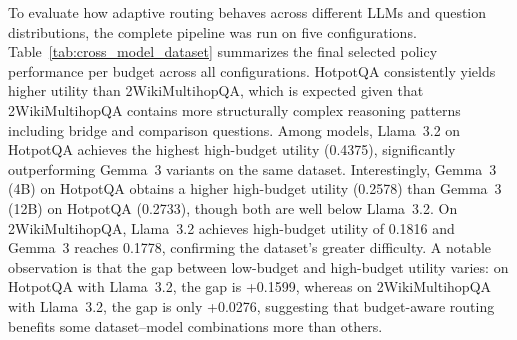 \documentclass[12pt,a4paper]{article}
\begin{document}
To evaluate how adaptive routing behaves across different LLMs and question distributions, the complete pipeline was run on five configurations. Table~\ref{tab:cross_model_dataset} summarizes the final selected policy performance per budget across all configurations. HotpotQA consistently yields higher utility than 2WikiMultihopQA, which is expected given that 2WikiMultihopQA contains more structurally complex reasoning patterns including bridge and comparison questions. Among models, Llama~3.2 on HotpotQA achieves the highest high-budget utility (0.4375), significantly outperforming Gemma~3 variants on the same dataset. Interestingly, Gemma~3 (4B) on HotpotQA obtains a higher high-budget utility (0.2578) than Gemma~3 (12B) on HotpotQA (0.2733), though both are well below Llama~3.2. On 2WikiMultihopQA, Llama~3.2 achieves high-budget utility of 0.1816 and Gemma~3 reaches 0.1778, confirming the dataset's greater difficulty. A notable observation is that the gap between low-budget and high-budget utility varies: on HotpotQA with Llama~3.2, the gap is +0.1599, whereas on 2WikiMultihopQA with Llama~3.2, the gap is only +0.0276, suggesting that budget-aware routing benefits some dataset--model combinations more than others.

\begin{table}[H]
\centering
\caption{Cross-model and cross-dataset comparison: final selected policy per budget (held-out test, 90 questions).}
\label{tab:cross_model_dataset}
\end{table}
\end{document}
